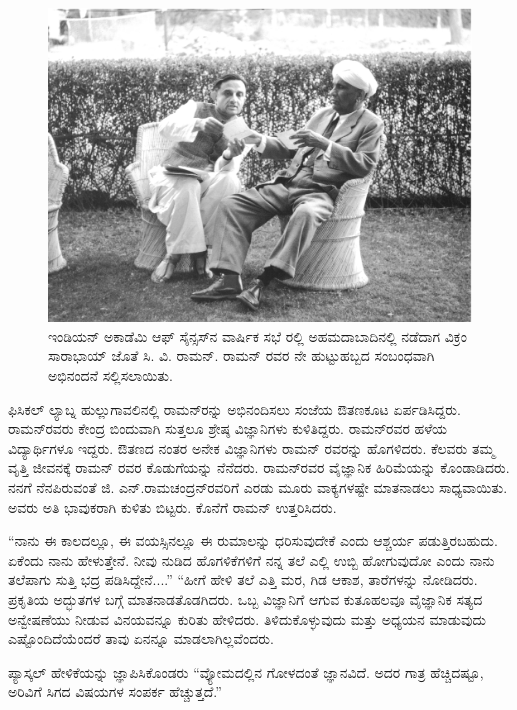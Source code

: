 \begin{figure}[!htbp]
\includegraphics[scale=0.21]{"images/11.jpg"}
\caption{ಇಂಡಿಯನ್ ಅಕಾಡೆಮಿ ಆಫ್ ಸೈನ್ಸಸ್‍ನ ವಾರ್ಷಿಕ ಸಭೆ ರಲ್ಲಿ ಅಹಮದಾಬಾದಿನಲ್ಲಿ ನಡೆದಾಗ ವಿಕ್ರಂ ಸಾರಾಭಾಯ್ ಜೊತೆ ಸಿ. ವಿ. ರಾಮನ್. ರಾಮನ್ ರವರ ನೇ ಹುಟ್ಟುಹಬ್ಬದ ಸಂಬಂಧವಾಗಿ ಅಭಿನಂದನೆ ಸಲ್ಲಿಸಲಾಯಿತು.}\label{chap2-fig02}
\end{figure}

ಫಿಸಿಕಲ್ ಲ್ಯಾಬ್ನ ಹುಲ್ಲುಗಾವಲಿನಲ್ಲಿ ರಾಮನ್‍ರನ್ನು ಅಭಿನಂದಿಸಲು ಸಂಜೆಯ ಔತಣಕೂಟ ಏರ್ಪಡಿಸಿದ್ದರು. ರಾಮನ್‍ರವರು ಕೇಂದ್ರ ಬಿಂದುವಾಗಿ ಸುತ್ತಲೂ ಶ್ರೇಷ್ಠ ವಿಜ್ಞಾನಿಗಳು ಕುಳಿತಿದ್ದರು. ರಾಮನ್‍ರವರ ಹಳೆಯ ವಿದ್ಯಾರ್ಥಿಗಳೂ ಇದ್ದರು. ಔತಣದ ನಂತರ ಅನೇಕ ವಿಜ್ಞಾನಿಗಳು ರಾಮನ್ ರವರನ್ನು ಹೊಗಳಿದರು. ಕೆಲವರು ತಮ್ಮ ವೃತ್ತಿ ಜೀವನಕ್ಕೆ ರಾಮನ್ ರವರ ಕೊಡುಗೆಯನ್ನು ನೆನೆದರು. ರಾಮನ್‍ರವರ ವೈಜ್ಞಾನಿಕ ಹಿರಿಮೆಯನ್ನು ಕೊಂಡಾಡಿದರು. ನನಗೆ ನೆನಪಿರುವಂತೆ ಜಿ. ಎನ್.\break ರಾಮಚಂದ್ರನ್‍ರವರಿಗೆ ಎರಡು ಮೂರು ವಾಕ್ಯಗಳಷ್ಟೇ ಮಾತನಾಡಲು ಸಾಧ್ಯವಾಯಿತು. ಅವರು ಅತಿ ಭಾವುಕರಾಗಿ ಕುಳಿತು ಬಿಟ್ಟರು. ಕೊನೆಗೆ ರಾಮನ್ ಉತ್ತರಿಸಿದರು.

 \enginline{-}“ನಾನು ಈ ಕಾಲದಲ್ಲೂ, ಈ ವಯಸ್ಸಿನಲ್ಲೂ ಈ ರುಮಾಲನ್ನು ಧರಿಸುವುದೇಕೆ ಎಂದು ಆಶ್ಚರ್ಯ ಪಡುತ್ತಿರಬಹುದು. ಏಕೆಂದು ನಾನು ಹೇಳುತ್ತೇನೆ. ನೀವು ನುಡಿದ ಹೊಗಳಿಕೆಗಳಿಗೆ ನನ್ನ ತಲೆ ಎಲ್ಲಿ ಉಬ್ಬಿ ಹೋಗುವುದೋ ಎಂದು ನಾನು ತಲೆಪಾಗು ಸುತ್ತಿ ಭದ್ರ ಪಡಿಸಿದ್ದೇನೆ....” “ಹೀಗೆ ಹೇಳಿ ತಲೆ ಎತ್ತಿ ಮರ, ಗಿಡ ಆಕಾಶ, ತಾರೆಗಳನ್ನು ನೋಡಿದರು. ಪ್ರಕೃತಿಯ ಅದ್ಭುತಗಳ ಬಗ್ಗೆ ಮಾತನಾಡತೊಡಗಿದರು. ಒಬ್ಬ ವಿಜ್ಞಾನಿಗೆ ಆಗುವ ಕುತೂಹಲವೂ ವೈಜ್ಞಾನಿಕ ಸತ್ಯದ ಅನ್ವೇಷಣೆಯು ನೀಡುವ ವಿನಯವನ್ನೂ ಕುರಿತು ಹೇಳಿದರು. ತಿಳಿದುಕೊಳ್ಳುವುದು ಮತ್ತು ಅಧ್ಯಯನ ಮಾಡುವುದು ಎಷ್ಟೊಂದಿದೆಯೆಂದರೆ ತಾವು ಏನನ್ನೂ ಮಾಡಲಾಗಿಲ್ಲವೆಂದರು. 

ಪ್ಯಾಸ್ಕಲ್ ಹೇಳಿಕೆಯನ್ನು ಜ್ಞಾಪಿಸಿಕೊಂಡರು\enginline{-} “ವ್ಯೋಮದಲ್ಲಿನ ಗೋಳದಂತೆ ಜ್ಞಾನವಿದೆ. ಅದರ ಗಾತ್ರ ಹೆಚ್ಚಿದಷ್ಟೂ, ಅರಿವಿಗೆ ಸಿಗದ ವಿಷಯಗಳ ಸಂಪರ್ಕ ಹೆಚ್ಚುತ್ತದೆ.”

